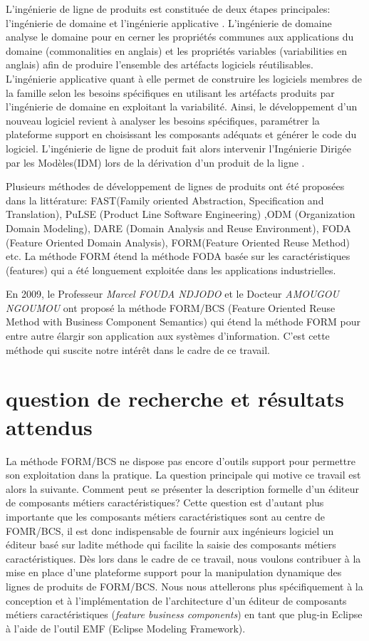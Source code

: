 L'ingénierie de ligne de produits est constituée de deux étapes principales: l'ingénierie de domaine et l'ingénierie applicative \cite{Klaus2005}. L'ingénierie de domaine analyse le domaine pour en cerner les propriétés communes aux applications du domaine (commonalities en anglais) et les propriétés variables (variabilities en anglais) afin de produire l'ensemble des artéfacts logiciels réutilisables. L'ingénierie applicative quant à elle permet de construire les logiciels membres de la famille selon les besoins spécifiques en utilisant les artéfacts produits par l'ingénierie de domaine en exploitant la variabilité. Ainsi, le développement d'un nouveau  logiciel revient à analyser les besoins spécifiques, paramétrer la plateforme support en choisissant les composants adéquats et générer le code du logiciel. L'ingénierie de ligne de produit fait alors intervenir l'Ingénierie Dirigée par les Modèles(IDM) lors de la dérivation d'un produit de la ligne \cite{Ngassam2017}.

Plusieurs méthodes de développement de lignes de produits ont été proposées dans la littérature: FAST(Family oriented Abstraction, Specification and Translation), PuLSE (Product Line Software Engineering)  ,ODM (Organization Domain Modeling), DARE (Domain Analysis and Reuse Environment), FODA (Feature Oriented Domain Analysis), FORM(Feature Oriented Reuse Method) etc. La méthode FORM étend la méthode FODA basée sur les caractéristiques (features) qui a été longuement exploitée dans les applications industrielles. 

En 2009, le Professeur \emph{Marcel FOUDA NDJODO} et le Docteur \emph{AMOUGOU NGOUMOU} ont proposé la méthode FORM/BCS (Feature Oriented Reuse Method with Business Component Semantics) \cite{Fouda2009} qui étend la méthode FORM pour entre autre élargir son application aux systèmes d’information. C'est cette méthode qui suscite notre intérêt dans le cadre de ce travail.

\section*{question de recherche et résultats attendus}
La méthode FORM/BCS ne dispose pas encore d’outils support pour permettre son exploitation dans la pratique. La question principale qui motive ce travail est alors la suivante. Comment peut se présenter la description formelle d'un éditeur de composants métiers caractéristiques? Cette question est d'autant plus importante que les composants métiers caractéristiques sont au centre de FOMR/BCS, il est donc indispensable de fournir aux ingénieurs logiciel un éditeur basé sur ladite méthode qui facilite la saisie des composants métiers caractéristiques.   Dès lors dans le cadre de ce travail, nous voulons contribuer à la mise en place d’une plateforme support pour la manipulation dynamique des lignes de produits de FORM/BCS. Nous nous attellerons plus spécifiquement à la conception et à l’implémentation de l’architecture d’un éditeur de composants métiers caractéristiques (\textit{feature business components}) en tant que plug-in Eclipse à l’aide de l’outil EMF (Eclipse Modeling Framework). 

